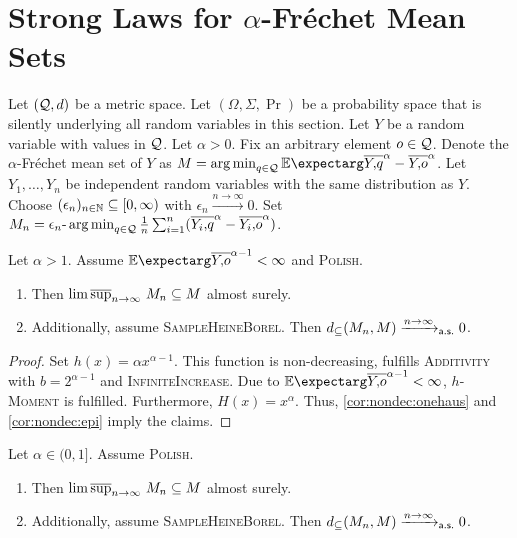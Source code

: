 %
\section{Strong Laws for $\alpha$-Fréchet Mean Sets}\label{sec:power}
%
Let $(\mathcal{Q}, d)$ be a metric space. Let $(\Omega, \Sigma, \Pr)$ be a probability space that is silently underlying all random variables in this section. Let $Y$ be a random variable with values in $\mathcal{Q}$.
Let $\alpha > 0$. Fix an arbitrary element $o\in\mathcal{Q}$. Denote the $\alpha$-Fréchet mean set of $Y$ as $M = \argmin_{q\in\mc Q} \Ex{\ol Yq^\alpha - \ol Yo^\alpha}$.
Let $Y_1, \dots, Y_n$ be independent random variables with the same distribution as $Y$.
Choose $(\epsilon_n)_{n\in\mathbb{N}}\subseteq [0,\infty)$ with $\epsilon_n \xrightarrow{n\to\infty}0$. Set $M_n =\epsilon_n\text{-}\operatorname*{arg\,min}_{q\in\mathcal{Q}} \frac1n \sum_{i=1}^n (\overline{Y_i,\!q}^\alpha - \overline{Y_i,\!o}^\alpha)$.
%
\begin{corollary}\label{cor:cons_da}
	Let $\alpha > 1$.
	Assume $\Ex{\ol Yo^{\alpha-1}} < \infty$ and \textsc{Polish}.	
	\begin{enumerate}[label=(\roman*)]
	\item Then $\operatorname*{lim\, \overline{sup}}_{n\to\infty}\, M_n \subseteq M$ almost surely.
	\item Additionally, assume \textsc{SampleHeineBorel}.
		Then $d_\subseteq(M_n, M) \xrightarrow{n\to\infty}_{\mathsf{a.s.}} 0$.
	\end{enumerate}	
\end{corollary}
%
\begin{proof}
	Set $h(x) = \alpha x^{\alpha-1}$. This function is non-decreasing, fulfills \textsc{Additivity} with $b = 2^{\alpha-1}$ and \textsc{InfiniteIncrease}.
	Due to $\Ex{\ol Yo^{\alpha-1}} < \infty$, \textsc{$h$-Moment} is fulfilled. Furthermore, $H(x) = x^\alpha$. Thus, \autoref{cor:nondec:onehaus} and \autoref{cor:nondec:epi} imply the claims.
\end{proof}
%
\begin{corollary}\label{cor:median}
	Let $\alpha \in (0,1]$. Assume \textsc{Polish}.
	\begin{enumerate}[label=(\roman*)]
	\item Then $\operatorname*{lim\, \overline{sup}}_{n\to\infty}\, M_n \subseteq M$ almost surely.
	\item Additionally, assume \textsc{SampleHeineBorel}.
		Then $d_\subseteq(M_n, M) \xrightarrow{n\to\infty}_{\mathsf{a.s.}} 0$.
	\end{enumerate}	
\end{corollary}
%
